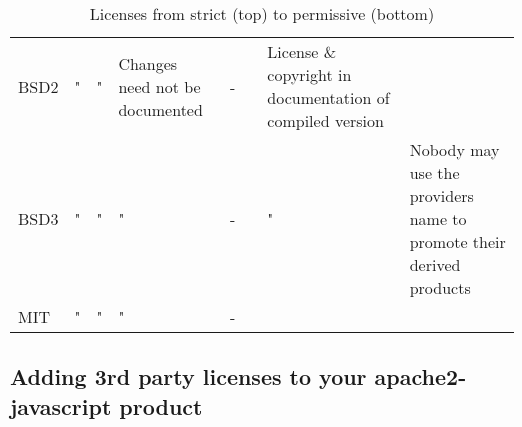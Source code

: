 \begin{table}[]
\begin{tabular}{@{}llllllll@{}}
    BSD2    & "                              & "                                    & Changes need not be documented & -                                                               &                                                              & License \& copyright in documentation of compiled version &                                                                                                                            \\
    BSD3    & "                              & "                                    & "                              & -                                                               &                                                              & "                                                         & Nobody may use the providers name to promote their derived products                                                        \\
    MIT     & "                              & "                                    & "                              & -                                                               &                                                              &                                                           &                                                                                                                            \\ \bottomrule
    \end{tabular}
    \caption{Licenses from strict (top) to permissive (bottom)}
    \end{table}


\subsection{Adding 3rd party licenses to your apache2-javascript product}

